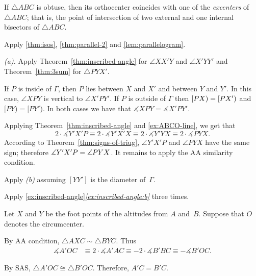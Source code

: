 If $\triangle ABC$ is obtuse, then its orthocenter coincides with one of the \emph{excenters} of $\triangle ABC$;
that is, 
the point of intersection of two external and one internal bisectors of $\triangle ABC$.
 
 Apply \ref{thm:isos}, \ref{thm:parallel-2} 
and \ref{lem:parallelogram}.

\setcounter{eqtn}{0}

 \textit{(a).}
Apply Theorem~\ref{thm:inscribed-angle} for $\angle XX'Y$ and $\angle X'YY'$
and Theorem~\ref{thm:3sum} for $\triangle PYX'$.

 If $P$ is inside of $\Gamma$, then $P$ lies between $X$ and $X'$ and between $Y$ and $Y'$.
In this case, $\angle XPY$ is vertical to $\angle X'PY'$.
If $P$ is outside of $\Gamma$ then $[PX)\z=[PX')$ and $[PY)=[PY')$.
In both cases we have that $\measuredangle XPY=\measuredangle X'PY'$.

Applying Theorem~\ref{thm:inscribed-angle} and \ref{ex:ABCO-line}, we get that
\[2\cdot \measuredangle Y'X'P
\equiv
2\cdot \measuredangle Y'X'X 
\equiv
2\cdot\measuredangle Y'YX
\equiv
2\cdot\measuredangle PYX.\]
According to Theorem~\ref{thm:signs-of-triug}, $\angle Y'X'P$ and $\angle PYX$ have the same sign;
therefore
$\measuredangle Y'X'P\z= \measuredangle PYX$.
It remains to apply the AA similarity condition.

 Apply \textit{(b)} assuming $[YY']$ is the diameter of~$\Gamma$. 

 Apply \ref{ex:inscribed-angle}\textit{\ref{ex:inscribed-angle:b}}
three times.

Let $X$ and $Y$ be the foot points of the altitudes from $A$ and~$B$.
Suppose that $O$ denotes the circumcenter.
 
By AA condition, $\triangle A X C\sim \triangle B Y C$.
Thus 
\begin{align*}
\measuredangle A'OC
&\equiv 
2\cdot \measuredangle A' A C
\equiv-2\cdot\measuredangle B' B C
\equiv-\measuredangle B'OC.
\end{align*}

By SAS, $\triangle A'OC\cong\triangle B'OC$.
Therefore, $A'C=B'C$.


